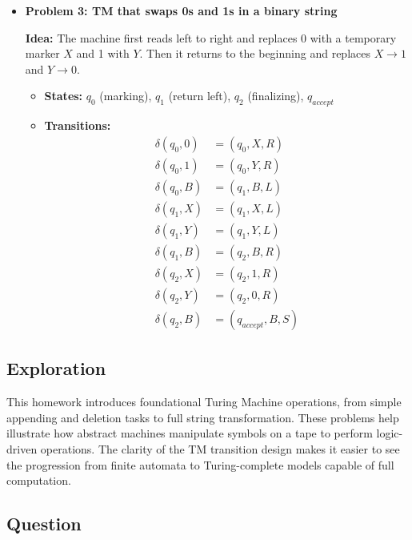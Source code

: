\documentclass[11pt]{article}
\begin{document}
\begin{itemize}[leftmargin=*]
\vspace{1em}

\item \textbf{Problem 3: TM that swaps 0s and 1s in a binary string}

\textbf{Idea:}  
The machine first reads left to right and replaces 0 with a temporary marker \(X\) and 1 with \(Y\). Then it returns to the beginning and replaces \(X \rightarrow 1\) and \(Y \rightarrow 0\).

\begin{itemize}
    \item \textbf{States:} \( q_0 \) (marking), \( q_1 \) (return left), \( q_2 \) (finalizing), \( q_{accept} \)
    \item \textbf{Transitions:}
    \[
    \begin{aligned}
    \delta(q_0, 0) &= (q_0, X, R) \\
    \delta(q_0, 1) &= (q_0, Y, R) \\
    \delta(q_0, B) &= (q_1, B, L) \\
    \delta(q_1, X) &= (q_1, X, L) \\
    \delta(q_1, Y) &= (q_1, Y, L) \\
    \delta(q_1, B) &= (q_2, B, R) \\
    \delta(q_2, X) &= (q_2, 1, R) \\
    \delta(q_2, Y) &= (q_2, 0, R) \\
    \delta(q_2, B) &= (q_{accept}, B, S)
    \end{aligned}
    \]
\end{itemize}

\end{itemize}

\subsection{Exploration}

This homework introduces foundational Turing Machine operations, from simple appending and deletion tasks to full string transformation. These problems help illustrate how abstract machines manipulate symbols on a tape to perform logic-driven operations. The clarity of the TM transition design makes it easier to see the progression from finite automata to Turing-complete models capable of full computation.

\subsection{Question}
\end{document}
